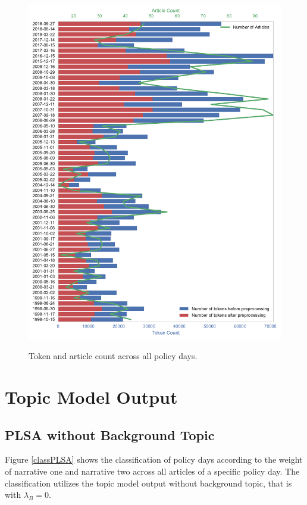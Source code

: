 \documentclass[11pt,a4paper,english,oneside]{book}
\numberwithin{equation}{chapter}
\begin{document}
\begin{figure}
	\caption{Token and article count across all policy days.}
	\centering
	\includegraphics[scale=1]{Images/tokencount.pdf}
	\label{tokencount}
\end{figure}

\renewcommand{\theequation}{C.\arabic{equation}}


\chapter{Topic Model Output}\label{AppendixC}

\section{PLSA without Background Topic}\label{AppendixC1}

Figure \ref{classPLSA} shows the classification of policy days according to the weight of narrative one and narrative two across all articles of a specific policy day. The classification utilizes the topic model output without background topic, that is with $\lambda_B = 0$. 
\end{document}
